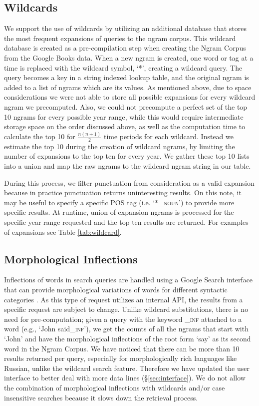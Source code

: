 \documentclass[11pt]{article}
\begin{document}
\subsection{Wildcards}
\label{sec:wildcards}
	We support the use of wildcards by utilizing an additional database that stores the most frequent expansions of queries to the ngram corpus. This wildcard database is created as a pre-compilation step when creating the Ngram Corpus from the Google Books data. When a new ngram is created, one word or tag at a time is replaced with the wildcard symbol, `*', creating a wildcard query. The query becomes a key in a string indexed lookup table, and the original ngram is added to a list of ngrams which are its values. As mentioned above, due to space considerations we were not able to store all possible expansions for every wildcard ngram we precomputed. Also, we could not precompute a perfect set of the top 10 ngrams for every possible year range, while this would require intermediate storage space on the order discussed above, as well as the computation time to calculate the top 10 for $\frac{n(n+1)}{2}$ time periods for each wildcard. Instead we estimate the top 10 during the creation of wildcard ngrams, by limiting the number of expansions to the top ten for every year. We gather these top 10 lists into a union and map the raw ngrams to the wildcard ngram string in our table. 
	
	During this process, we filter punctuation from consideration as a valid expansion because in practice punctuation returns uninteresting results. On this note, it may be useful to specify a specific POS tag (i.e. `*\textsf{\textsc{\_noun}}') to provide more specific results. At runtime, union of expansion ngrams is processed for the specific year range requested and the top ten results are returned. For examples of expansions see Table \ref{tab:wildcard}. 


\subsection{Morphological Inflections}
Inflections of words in search queries are handled using a Google Search interface that can provide morphological variations of words for different syntactic categories \cite{durrett2013supervised}. As this type of request utilizes an internal API, the results from a specific request are subject to change. Unlike wildcard substitutions, there is no need for pre-computation; given a query with the keyword \textsf{\textsc{\_inf}} attached to a word (e.g., `John said\textsf{\textsc{\_inf}}'), we get the counts of all the ngrams that start with `John' and have the morphological inflections of the root form `say' as its second word in the Ngram Corpus. We have noticed that there can be more than 10 results returned per query, especially for morphologically rich languages like Russian, unlike the wildcard search feature. Therefore we have updated the user interface to better deal with more data lines (\S\ref{sec:interface}). We do not allow the combination of morphological inflections with wildcards and/or case insensitive searches
because it slows down the retrieval process.
\end{document}
